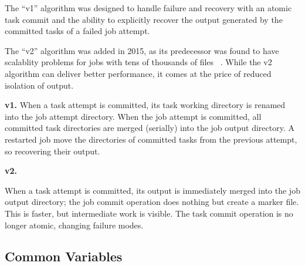 \documentclass[conference]{IEEEtran}
\begin{document}
The ``v1'' algorithm was designed to handle failure and recovery with an
atomic task commit and the ability to explicitly recover the output generated
by the committed tasks of a failed job attempt.

The ``v2'' algorithm was added in 2015, as its predecessor was found
to have scalablity problems for jobs with tens of thousands of files
\ \cite{MAPREDUCE-4815}.
While the v2 algorithm can deliver better performance, it comes at the price of
reduced isolation of output.

\textbf{v1.}
When a task attempt is committed, its task working directory is renamed into
the job attempt directory.
When the job attempt is committed, all committed task directories are merged
(serially) into the job output directory.
A restarted job move the directories of committed tasks from the previous
attempt, so recovering their output.


\textbf{v2.}

When a task attempt is committed, its output is immediately merged into the
job output directory;
the job commit operation does nothing but create a marker file.
This is faster, but intermediate work is visible.
The task commit operation is no longer atomic, changing failure modes.


\subsection{Common Variables}
\label{subsec:common-variables}
\end{document}
